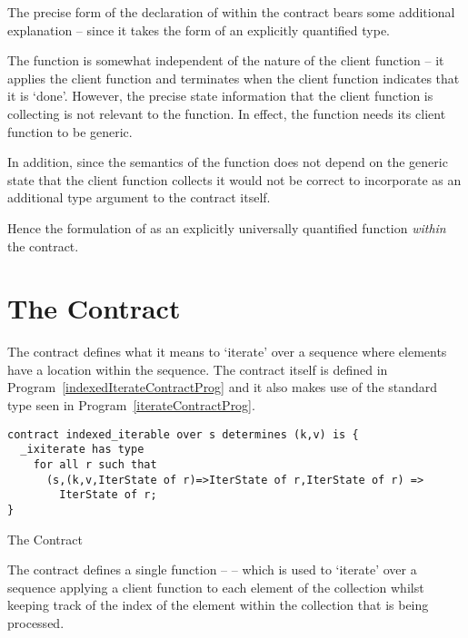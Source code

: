 \begin{aside}
The precise form of the declaration of  within the  contract bears some additional explanation -- since it takes the form of an explicitly quantified type.

The  function is somewhat independent of the nature of the client function -- it applies the client function and terminates when the client function indicates that it is `done'. However, the precise state information that the client function is collecting is not relevant to the  function. In effect, the  function needs its client function to be generic.

In addition, since the semantics of the  function does not depend on the generic state that the client function collects it would not be correct to incorporate  as an additional type argument to the contract itself.

Hence the formulation of  as an explicitly universally quantified function \emph{within} the contract.
\end{aside}

\section{The  Contract}
\label{indexedIterableContract}
The  contract defines what it means to `iterate' over a sequence where elements have a location within the sequence. The contract itself is defined in Program~\vref{indexedIterateContractProg} and it also makes use of the standard  type seen in Program~\vref{iterateContractProg}.

\begin{program}[H]
\begin{lstlisting}
contract indexed_iterable over s determines (k,v) is {
  _ixiterate has type 
    for all r such that 
      (s,(k,v,IterState of r)=>IterState of r,IterState of r) => 
        IterState of r;
}
\end{lstlisting}
\caption{The  Contract\label{indexedIterateContractProg}}
\end{program}

The  contract defines a single function --  -- which is used to `iterate' over a sequence applying a client function to each element of the collection whilst keeping track of the index of the element within the collection that is being processed.

